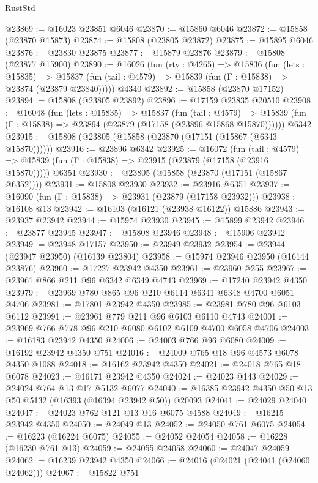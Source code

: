 \begin{lexlean}{RustStd}
\begin{coremodule}
@23869 := @16023 @23851 @6046
@23870 := @15860 @6046
@23872 := @15858 (@23870 @15873)
@23874 := @15808 (@23805 @23872)
@23875 := @15895 @6046
@23876 := @23830 @23875
@23877 := @15879 @23876
@23879 := @15808 (@23877 @15900)
@23890 := @16026
    (fun (rty : @4265) =>
    @15836
      (fun (lets : @15835) =>
      @15837 (fun (tail : @4579) => @15839 (fun (Γ : @15838) => @23874 (@23879 @23840)))))
    @4340
@23892 := @15858 (@23870 @17152)
@23894 := @15808 (@23805 @23892)
@23896 := @17159 @23835 @20510
@23908 := @16048
    (fun (lets : @15835) =>
    @15837
      (fun (tail : @4579) =>
      @15839 (fun (Γ : @15838) => @23894 (@23879 (@17158 (@23896 @15868 @15870))))))
    @6342
@23915 := @15808 (@23805 (@15858 (@23870 (@17151 (@15867 (@6343 @15870))))))
@23916 := @23896 @6342
@23925 := @16072
    (fun (tail : @4579) => @15839 (fun (Γ : @15838) => @23915 (@23879 (@17158 (@23916 @15870)))))
    @6351
@23930 := @23805 (@15858 (@23870 (@17151 (@15867 @6352))))
@23931 := @15808 @23930
@23932 := @23916 @6351
@23937 := @16090 (fun (Γ : @15838) => @23931 (@23879 (@17158 @23932)))
@23938 := @16108 @13
@23942 := @16103 (@16121 (@23938 @16122)) @15886
@23943 := @23937 @23942
@23944 := @15974 @23930
@23945 := @15899 @23942
@23946 := @23877 @23945
@23947 := @15808 @23946
@23948 := @15906 @23942
@23949 := @23948 @17157
@23950 := @23949 @23932
@23954 := @23944 (@23947 @23950) (@16139 @23804)
@23958 := @15974 @23946 @23950 (@16144 @23876)
@23960 := @17227 @23942 @4350
@23961 := @23960 @255
@23967 := @23961 @866 @211 @96 @6342 @6349 @4743
@23969 := @17240 @23942 @4350
@23979 := @23969 @780 @865 @96 @210 @6114 @6341 @6348 @4700 @6051 @4706
@23981 := @17801 @23942 @4350
@23985 := @23981 @780 @96 @6103 @6112
@23991 := @23961 @779 @211 @96 @6103 @6110 @4743
@24001 := @23969 @766 @778 @96 @210 @6080 @6102 @6109 @4700 @6058 @4706
@24003 := @16183 @23942 @4350
@24006 := @24003 @766 @96 @6080
@24009 := @16192 @23942 @4350 @751
@24016 := @24009 @765 @18 @96 @4573 @6078 @4350 @1088
@24018 := @16162 @23942 @4350
@24021 := @24018 @765 @18 @6078
@24023 := @16171 @23942 @4350
@24024 := @24023 @143
@24029 := @24024 @764 @13 @17 @5132 @6077
@24040 := @16385 @23942 @4350 @50 @13 @50 @5132 (@16393 (@16394 @23942 @50)) @20093
@24041 := @24029 @24040
@24047 := @24023 @762 @121 @13 @16 @6075 @4588
@24049 := @16215 @23942 @4350
@24050 := @24049 @13
@24052 := @24050 @761 @6075
@24054 := @16223 (@16224 @6075)
@24055 := @24052 @24054
@24058 := @16228 (@16230 @761 @13)
@24059 := @24055 @24058
@24060 := @24047 @24059
@24062 := @16239 @23942 @4350
@24066 := @24016 (@24021 (@24041 (@24060 @24062)))
@24067 := @15822 @751

\end{coremodule}
\end{lexlean}
